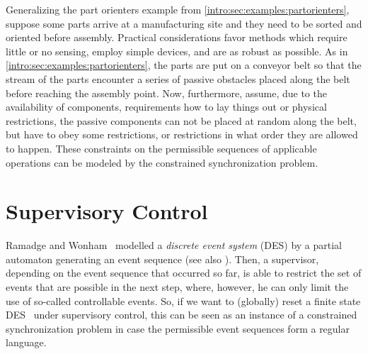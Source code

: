 Generalizing the part orienters example
from \cref{intro:sec:examples:partorienters}, suppose some parts arrive at a manufacturing site and they
need to be sorted and oriented before assembly. Practical considerations
favor methods which require little or no sensing, employ simple devices,
and are as robust as possible. 
As in \cref{intro:sec:examples:partorienters},
the parts are put on a conveyor belt
so that the stream of the parts encounter a series of passive obstacles
placed along the belt before reaching the assembly point.
Now, furthermore, assume, due to the availability of components, requirements how to lay things out
or physical restrictions,
the passive components can %
not be placed at random along
the belt, but have to obey some restrictions, or restrictions
in what order they are allowed to happen. 
These constraints on the
permissible sequences of applicable operations 
can be modeled by the constrained synchronization problem.


\section{Supervisory Control} 
\label{constrsync:sec:motivation:supervisory}

Ramadge and Wonham~\cite{RamadgeWonham87} modelled
 a \emph{discrete event system} (DES) by a partial automaton 
 generating an event sequence (see also \cite{DBLP:books/daglib/0034521,wonham2019}). 
 Then, a supervisor,  depending on the event sequence 
 that occurred so far,
 is able to restrict the set of events
 that are possible in the next step, where, however,
 he can only limit the use of so-called controllable events.
 So, if we want to (globally) reset a finite state DES~\cite{Alves2020} under supervisory control, 
 this can be seen as an instance of a constrained synchronization problem
 in case the permissible event sequences form
 a regular language.
 
 

